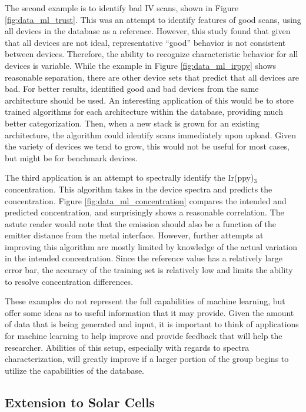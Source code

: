 \documentclass[../thesis.tex]{subfiles}
\begin{document}
The second example is to identify bad IV scans, shown in Figure \ref{fig:data_ml_trust}.
This was an attempt to identify features of good \eqe scans, using all devices in the database as a reference.
However, this study found that given that all devices are not ideal, representative ``good'' behavior is not consistent between devices.
Therefore, the ability to recognize characteristic behavior for all devices is variable.
While the example in Figure \ref{fig:data_ml_irppy} shows reasonable separation, there are other device sets that predict that all devices are bad.
For better results, identified good and bad devices from the same architecture should be used.
An interesting application of this would be to store trained algorithms for each architecture within the database, providing much better categorization.
Then, when a new stack is grown for an existing architecture, the algorithm could identify scans immediately upon upload.
Given the variety of devices we tend to grow, this would not be useful for most cases, but might be for benchmark devices.

The third application is an attempt to spectrally identify the Ir(ppy)$_3$ concentration.
This algorithm takes in the device spectra and predicts the \irppy concentration.
Figure \ref{fig:data_ml_concentration} compares the intended and predicted concentration, and surprisingly shows a reasonable correlation.
The astute reader would note that the emission should also be a function of the emitter distance from the metal interface.
However, further attempts at improving this algorithm are mostly limited by knowledge of the actual variation in the intended concentration.
Since the reference value has a relatively large error bar, the accuracy of the training set is relatively low and limits the ability to resolve concentration differences.

These examples do not represent the full capabilities of machine learning, but offer some ideas as to useful information that it may provide.
Given the amount of data that is being generated and input, it is important to think of applications for machine learning to help improve and provide feedback that will help the researcher.  
Abilities of this setup, especially with regards to spectra characterization, will greatly improve if a larger portion of the group begins to utilize the capabilities of the database.


\subsection{Extension to Solar Cells}
\end{document}
